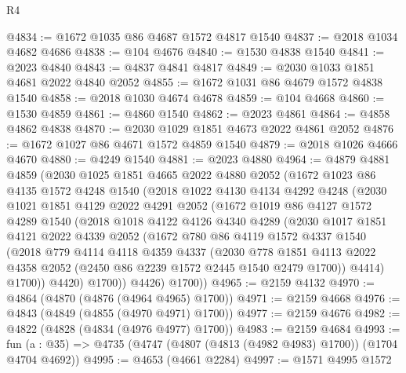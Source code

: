 \begin{lexlean}{R4}
\begin{coremodule}
@4834 := @1672 @1035 @86 @4687 @1572 @4817 @1540
@4837 := @2018 @1034 @4682 @4686
@4838 := @104 @4676
@4840 := @1530 @4838 @1540
@4841 := @2023 @4840
@4843 := @4837 @4841 @4817
@4849 := @2030 @1033 @1851 @4681 @2022 @4840 @2052
@4855 := @1672 @1031 @86 @4679 @1572 @4838 @1540
@4858 := @2018 @1030 @4674 @4678
@4859 := @104 @4668
@4860 := @1530 @4859
@4861 := @4860 @1540
@4862 := @2023 @4861
@4864 := @4858 @4862 @4838
@4870 := @2030 @1029 @1851 @4673 @2022 @4861 @2052
@4876 := @1672 @1027 @86 @4671 @1572 @4859 @1540
@4879 := @2018 @1026 @4666 @4670
@4880 := @4249 @1540
@4881 := @2023 @4880
@4964 := @4879
    @4881
    @4859
    (@2030
      @1025
      @1851
      @4665
      @2022
      @4880
      @2052
      (@1672
        @1023
        @86
        @4135
        @1572
        @4248
        @1540
        (@2018
          @1022
          @4130
          @4134
          @4292
          @4248
          (@2030
            @1021
            @1851
            @4129
            @2022
            @4291
            @2052
            (@1672
              @1019
              @86
              @4127
              @1572
              @4289
              @1540
              (@2018
                @1018
                @4122
                @4126
                @4340
                @4289
                (@2030
                  @1017
                  @1851
                  @4121
                  @2022
                  @4339
                  @2052
                  (@1672
                    @780
                    @86
                    @4119
                    @1572
                    @4337
                    @1540
                    (@2018
                      @779
                      @4114
                      @4118
                      @4359
                      @4337
                      (@2030
                        @778
                        @1851
                        @4113
                        @2022
                        @4358
                        @2052
                        (@2450 @86 @2239 @1572 @2445 @1540 @2479 @1700))
                      @4414)
                    @1700))
                @4420)
              @1700))
          @4426)
        @1700))
@4965 := @2159 @4132
@4970 := @4864 (@4870 (@4876 (@4964 @4965) @1700))
@4971 := @2159 @4668
@4976 := @4843 (@4849 (@4855 (@4970 @4971) @1700))
@4977 := @2159 @4676
@4982 := @4822 (@4828 (@4834 (@4976 @4977) @1700))
@4983 := @2159 @4684
@4993 := fun (a : @35) => @4735 (@4747 (@4807 (@4813 (@4982 @4983) @1700)) (@1704 @4704 @4692))
@4995 := @4653 (@4661 @2284)
@4997 := @1571 @4995 @1572

\end{coremodule}
\end{lexlean}
